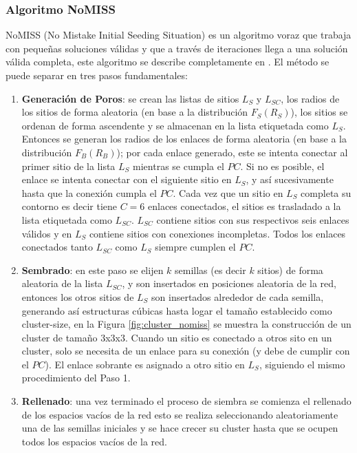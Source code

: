 \subsubsection{Algoritmo NoMISS}
\label{subsubsec:nomiss}
NoMISS (No Mistake Initial Seeding Situation) es un algoritmo voraz que trabaja con pequeñas soluciones válidas y que a través de iteraciones llega a una solución válida completa, este algoritmo se describe completamente en \cite{ref3}. El método se puede separar en tres pasos fundamentales:

\begin{enumerate}
\item \textbf{Generación de Poros}: se crean las listas de sitios $L_{S}$ y $L_{SC}$, los radios de los sitios de forma aleatoria (en base a la distribución $F_S(R_S)$), los sitios se ordenan de forma ascendente y se almacenan en la lista etiquetada como $L_{S}$. Entonces se generan los radios de los enlaces  de forma aleatoria (en base a la distribución $F_B(R_B)$); por cada enlace generado, este se intenta conectar al primer sitio de la lista $L_{S}$ mientras se cumpla el $PC$. Si no es posible, el enlace se intenta conectar con el siguiente sitio en $L_{S}$, y así sucesivamente hasta que la conexión cumpla el $PC$. Cada vez que un sitio en $L_{S}$ completa su contorno es decir tiene $C=6$ enlaces conectados, el sitios es trasladado a la lista etiquetada como $L_{SC}$. $L_{SC}$ contiene sitios con sus respectivos seis enlaces válidos y en $L_{S}$ contiene sitios con conexiones incompletas. Todos los enlaces conectados tanto $L_{SC}$ como $L_{S}$ siempre cumplen el $PC$.\\

\item \textbf{Sembrado}: en este paso se elijen $k$ semillas (es decir $k$ sitios) de forma aleatoria de la lista $L_{SC}$, y son insertados en posiciones aleatoria de la red, entonces los otros sitios de $L_{S}$ son insertados alrededor de cada semilla, generando así estructuras cúbicas hasta logar el tamaño establecido como cluster-size, en la Figura \ref{fig:cluster_nomiss}  se muestra la construcción de un cluster de tamaño 3x3x3. Cuando un sitio es conectado a otros sito en un cluster, solo se necesita de un enlace para su conexión (y debe de cumplir con el $PC$). El enlace sobrante es asignado a otro sitio en $L_{S}$, siguiendo el mismo procedimiento del Paso 1.\\

\item \textbf{Rellenado}: una vez terminado el proceso de siembra se comienza el rellenado de los espacios vacíos de la red esto se realiza seleccionando aleatoriamente una de las semillas iniciales y se hace crecer su cluster hasta que se ocupen todos los espacios vacíos de la red.
\end{enumerate}

